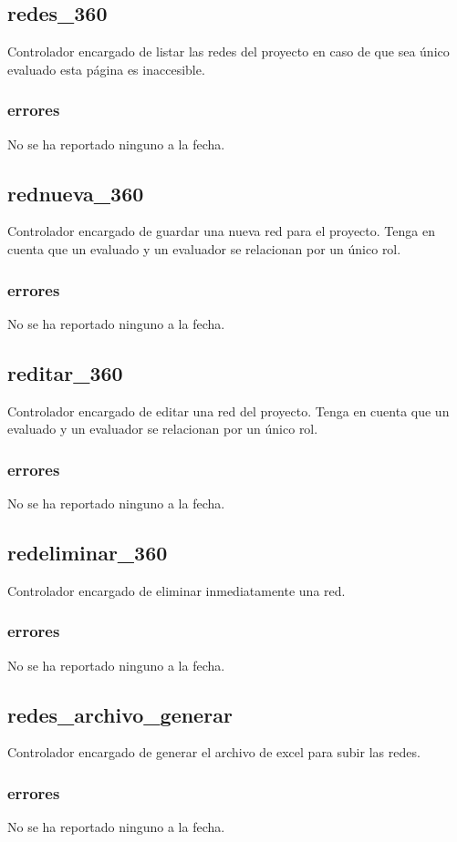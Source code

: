 \documentclass[10pt,a4paper]{book}
\begin{document}
	\subsection{redes\_360}
	Controlador encargado de listar las redes del proyecto en caso de que sea único evaluado esta página es inaccesible.
	\subsubsection{errores}
	No se ha reportado ninguno a la fecha.

	\subsection{rednueva\_360}
	Controlador encargado de guardar una nueva red para el proyecto. Tenga en cuenta que un evaluado y un evaluador se relacionan por un único rol.
	\subsubsection{errores}
	No se ha reportado ninguno a la fecha.

	\subsection{reditar\_360}
	Controlador encargado de editar una red del proyecto. Tenga en cuenta que un evaluado y un evaluador se relacionan por un único rol.
	\subsubsection{errores}
	No se ha reportado ninguno a la fecha.

	\subsection{redeliminar\_360}
	Controlador encargado de eliminar inmediatamente una red.
	\subsubsection{errores}
	No se ha reportado ninguno a la fecha.

	\subsection{redes\_archivo\_generar}
	Controlador encargado de generar el archivo de excel para subir las redes.
	\subsubsection{errores}
	No se ha reportado ninguno a la fecha.
\end{document}
